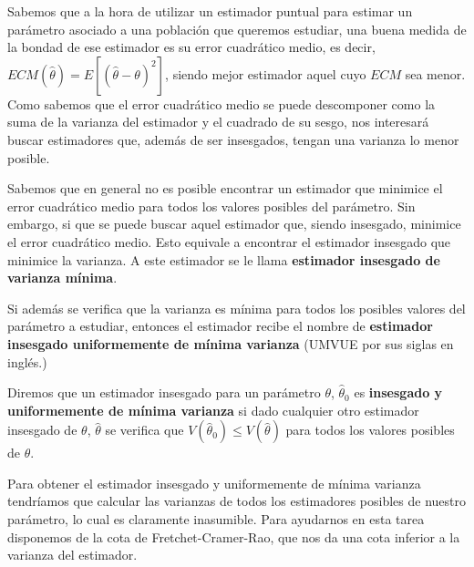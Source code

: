 
Sabemos que a la hora de utilizar un estimador puntual para estimar un par\'ametro asociado a una poblaci\'on que queremos estudiar, una buena medida de la bondad de ese estimador es su error cuadr\'atico medio, es decir, $ECM(\hat{\theta})=E[(\hat{\theta}-\theta)^2]$, siendo mejor estimador aquel cuyo $ECM$ sea menor. Como sabemos que el error cuadr\'atico medio se puede descomponer como la suma de la varianza del estimador y el cuadrado de su sesgo, nos interesar\'a buscar estimadores que, adem\'as de ser insesgados, tengan una varianza lo menor posible.

Sabemos que en general no es posible encontrar un estimador que minimice el error cuadr\'atico medio para todos los valores posibles del par\'ametro. Sin embargo, si que se puede buscar aquel estimador que, siendo insesgado, minimice el error cuadr\'atico medio. Esto equivale a encontrar el estimador insesgado que minimice la varianza. A este estimador se le llama \textbf{estimador insesgado de varianza m\'inima}.

Si adem\'as se verifica que la varianza es m\'inima para todos los posibles valores del par\'ametro a estudiar, entonces el estimador recibe el nombre de \textbf{estimador insesgado uniformemente de m\'inima varianza} (UMVUE por sus siglas en ingl\'es.)

\begin{definicion}
Diremos que un estimador insesgado para un par\'ametro $\theta$, $\hat{\theta}_0$ es \textbf{insesgado y uniformemente de m\'inima varianza} si dado cualquier otro estimador insesgado de $\theta$, $\hat{\theta}$ se verifica que $V(\hat{\theta}_0)\leq V(\hat{\theta})$ para todos los valores posibles de $\theta$.
\end{definicion}

Para obtener el estimador insesgado y uniformemente de m\'inima varianza tendr\'iamos que calcular las varianzas de todos los estimadores posibles de nuestro par\'ametro, lo cual es claramente inasumible. Para ayudarnos en esta tarea disponemos de la cota de Fretchet-Cramer-Rao, que nos da una cota inferior a la varianza del estimador.

